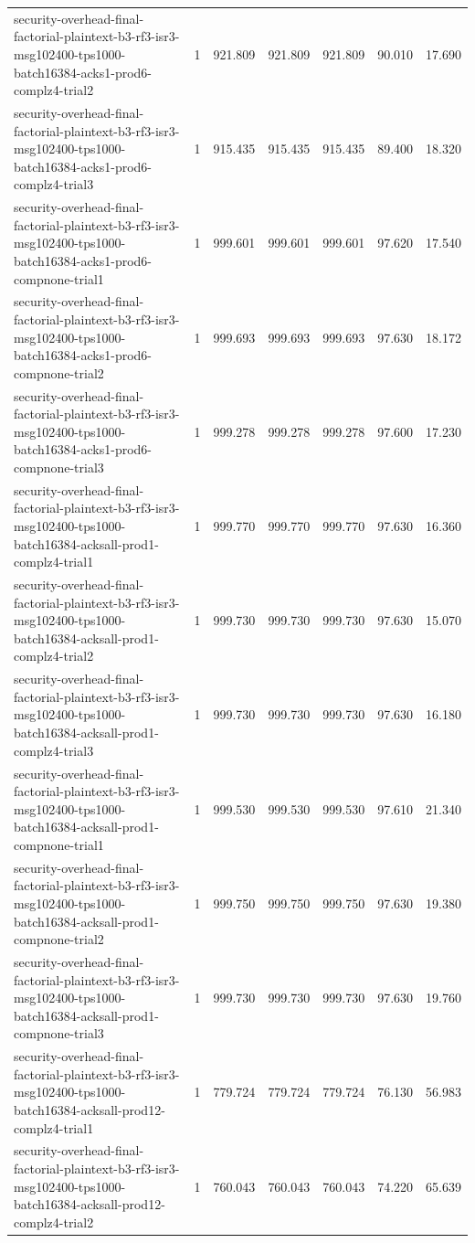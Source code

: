 \begin{tabular}{lrrrrrr}
security-overhead-final-factorial-plaintext-b3-rf3-isr3-msg102400-tps1000-batch16384-acks1-prod6-complz4-trial2 & 1 & 921.809 & 921.809 & 921.809 & 90.010 & 17.690 \\
security-overhead-final-factorial-plaintext-b3-rf3-isr3-msg102400-tps1000-batch16384-acks1-prod6-complz4-trial3 & 1 & 915.435 & 915.435 & 915.435 & 89.400 & 18.320 \\
security-overhead-final-factorial-plaintext-b3-rf3-isr3-msg102400-tps1000-batch16384-acks1-prod6-compnone-trial1 & 1 & 999.601 & 999.601 & 999.601 & 97.620 & 17.540 \\
security-overhead-final-factorial-plaintext-b3-rf3-isr3-msg102400-tps1000-batch16384-acks1-prod6-compnone-trial2 & 1 & 999.693 & 999.693 & 999.693 & 97.630 & 18.172 \\
security-overhead-final-factorial-plaintext-b3-rf3-isr3-msg102400-tps1000-batch16384-acks1-prod6-compnone-trial3 & 1 & 999.278 & 999.278 & 999.278 & 97.600 & 17.230 \\
security-overhead-final-factorial-plaintext-b3-rf3-isr3-msg102400-tps1000-batch16384-acksall-prod1-complz4-trial1 & 1 & 999.770 & 999.770 & 999.770 & 97.630 & 16.360 \\
security-overhead-final-factorial-plaintext-b3-rf3-isr3-msg102400-tps1000-batch16384-acksall-prod1-complz4-trial2 & 1 & 999.730 & 999.730 & 999.730 & 97.630 & 15.070 \\
security-overhead-final-factorial-plaintext-b3-rf3-isr3-msg102400-tps1000-batch16384-acksall-prod1-complz4-trial3 & 1 & 999.730 & 999.730 & 999.730 & 97.630 & 16.180 \\
security-overhead-final-factorial-plaintext-b3-rf3-isr3-msg102400-tps1000-batch16384-acksall-prod1-compnone-trial1 & 1 & 999.530 & 999.530 & 999.530 & 97.610 & 21.340 \\
security-overhead-final-factorial-plaintext-b3-rf3-isr3-msg102400-tps1000-batch16384-acksall-prod1-compnone-trial2 & 1 & 999.750 & 999.750 & 999.750 & 97.630 & 19.380 \\
security-overhead-final-factorial-plaintext-b3-rf3-isr3-msg102400-tps1000-batch16384-acksall-prod1-compnone-trial3 & 1 & 999.730 & 999.730 & 999.730 & 97.630 & 19.760 \\
security-overhead-final-factorial-plaintext-b3-rf3-isr3-msg102400-tps1000-batch16384-acksall-prod12-complz4-trial1 & 1 & 779.724 & 779.724 & 779.724 & 76.130 & 56.983 \\
security-overhead-final-factorial-plaintext-b3-rf3-isr3-msg102400-tps1000-batch16384-acksall-prod12-complz4-trial2 & 1 & 760.043 & 760.043 & 760.043 & 74.220 & 65.639 \\

\end{tabular}
